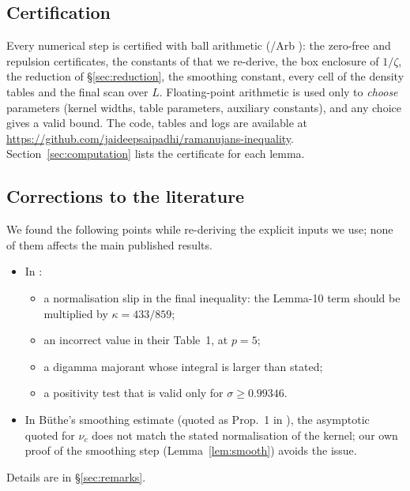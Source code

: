\subsection*{Certification}
Every numerical step is certified with ball arithmetic (/Arb \cite{arb}): the zero-free and repulsion certificates, the constants of \cite{BTY} that we re-derive, the box enclosure of $1/\zeta$, the reduction of \S\ref{sec:reduction}, the smoothing constant, every cell of the density tables and the final scan over $L$.
Floating-point arithmetic is used only to \emph{choose} parameters (kernel widths, table parameters, auxiliary constants), and any choice gives a valid bound.
The code, tables and logs are available at \url{https://github.com/jaideepsaipadhi/ramanujans-inequality}.
Section~\ref{sec:computation} lists the certificate for each lemma.

\subsection*{Corrections to the literature}
We found the following points while re-deriving the explicit inputs we use; none of them affects the main published results.
\begin{itemize}
\item In \cite{BTY}:
  \begin{itemize}
  \item a normalisation slip in the final inequality: the Lemma-10 term should be multiplied by $\kappa = 433/859$;
  \item an incorrect value in their Table~1, at $p = 5$;
  \item a digamma majorant whose integral is larger than stated;
  \item a positivity test that is valid only for $\sigma \ge 0.99346$.
  \end{itemize}
\item In B\"uthe's smoothing estimate \cite[Prop.~4]{Buthe2016} (quoted as Prop.~1 in \cite{Buthe2018}), the asymptotic quoted for $\nu_c$ does not match the stated normalisation of the kernel; our own proof of the smoothing step (Lemma~\ref{lem:smooth}) avoids the issue.
\end{itemize}
Details are in \S\ref{sec:remarks}.
